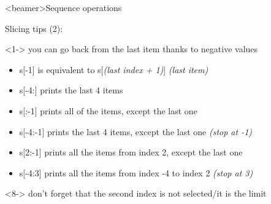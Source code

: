 \begin{frame}<beamer>{Sequence operations}

  \begin{center}

  Slicing tips (2):

  \bigskip

  \begin{onlyenv}<1->
    you can go back from the last item thanks to negative values \\
  \end{onlyenv}

  \bigskip

  \begin{itemize}
    \item<2-> s[-1] is equivalent to s[{\footnotesize\textit{(last index + 1)}}] \textit{(last item)} \\
    \item<3-> s[-4:] prints the last 4 items \\
    \item<4-> s[:-1] prints all of the items, except the last one \\
    \item<5-> s[-4:-1] prints the last 4 items, except the last one \textit{(stop at -1)} \\
    \item<6-> s[2:-1] prints all the items from index 2, except the last one \\
    \item<7-> s[-4:3] prints all the items from index -4 to index 2 \textit{(stop at 3)} \\
  \end{itemize}

  \bigskip

  \begin{onlyenv}<8->
    don't forget that the second index is not selected/it is the limit \\
  \end{onlyenv}

  \end{center}

\end{frame}




